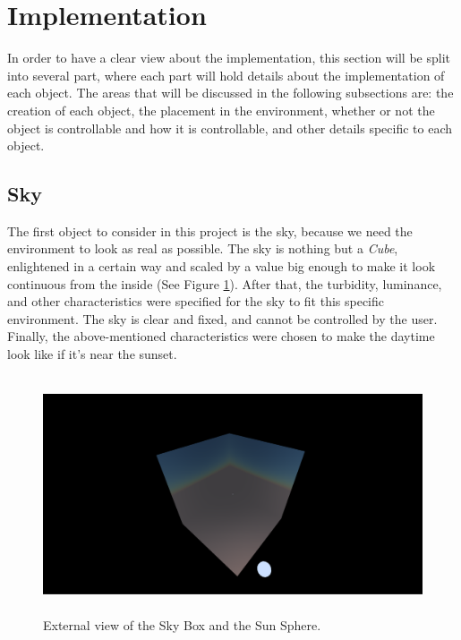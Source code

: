 \documentclass[paper=a4, fontsize=11pt]{scrartcl} %
\numberwithin{equation}{section} %
\numberwithin{figure}{section} %
\numberwithin{table}{section} %
\begin{document}
\newpage


\section{Implementation}

In order to have a clear view about the implementation, this section will be split into several part, where each part will hold details about the implementation of each object. The areas that will be discussed in the following subsections are: the creation of each object, the placement in the environment, whether or not the object is controllable and how it is controllable, and other details specific to each object.

\subsection{Sky}

The first object to consider in this project is the sky, because we need the environment to look as real as possible. The sky is nothing but a \textit{Cube}, enlightened in a certain way and scaled by a value big enough to make it look continuous from the inside (See Figure \ref{external}). After that, the turbidity, luminance, and other characteristics were specified for the sky to fit this specific environment. The sky is clear and fixed, and cannot be controlled by the user. Finally, the above-mentioned characteristics were chosen to make the daytime look like if it's near the sunset. 
\begin{figure}
\centering
\includegraphics[width=15cm, height=7cm]{images/skyBox&sunSphere.png}
\caption{External view of the Sky Box and the Sun Sphere.}
\label{external}
\end{figure}
\end{document}
